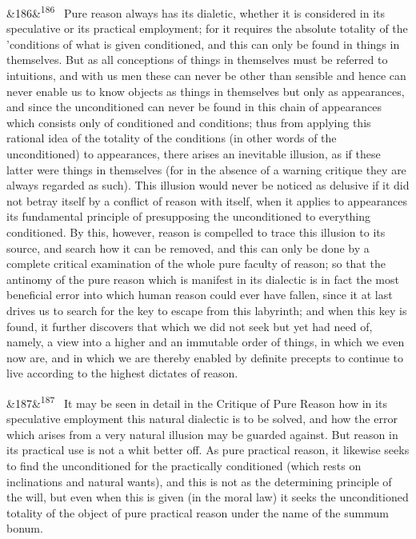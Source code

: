 \documentclass[12pt]{article}
\newcommand{\para}[1][]{\par\noindent\ifx&#1&\else\textsuperscript{\footnotesize #1}~\fi}
\begin{document}
\para[186] Pure reason always has its dialetic, whether it is considered in its speculative or its practical employment; for it requires the absolute totality of the 'conditions of what is given conditioned, and this can only be found in things in themselves. But as all conceptions of things in themselves must be referred to intuitions, and with us men these can never be other than sensible and hence can never enable us to know objects as things in themselves but only as appearances, and since the unconditioned can never be found in this chain of appearances which consists only of conditioned and conditions; thus from applying this rational idea of the totality of the conditions (in other words of the unconditioned) to appearances, there arises an inevitable illusion, as if these latter were things in themselves (for in the absence of a warning critique they are always regarded as such). This illusion would never be noticed as delusive if it did not betray itself by a conflict of reason with itself, when it applies to appearances its fundamental principle of presupposing the unconditioned to everything conditioned. By this, however, reason is compelled to trace this illusion to its source, and search how it can be removed, and this can only be done by a complete critical examination of the whole pure faculty of reason; so that the antinomy of the pure reason which is manifest in its dialectic is in fact the most beneficial error into which human reason could ever have fallen, since it at last drives us to search for the key to escape from this labyrinth; and when this key is found, it further discovers that which we did not seek but yet had need of, namely, a view into a higher and an immutable order of things, in which we even now are, and in which we are thereby enabled by definite precepts to continue to live according to the highest dictates of reason.

\para[187] It may be seen in detail in the Critique of Pure Reason how in its speculative employment this natural dialectic is to be solved, and how the error which arises from a very natural illusion may be guarded against. But reason in its practical use is not a whit better off. As pure practical reason, it likewise seeks to find the unconditioned for the practically conditioned (which rests on inclinations and natural wants), and this is not as the determining principle of the will, but even when this is given (in the moral law) it seeks the unconditioned totality of the object of pure practical reason under the name of the summum bonum.
\end{document}
